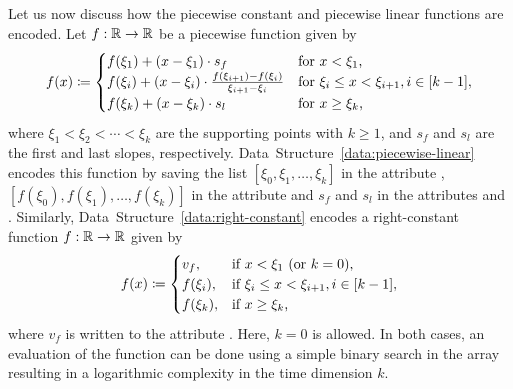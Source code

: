 Let us now discuss how the piecewise constant and piecewise linear functions are encoded.
Let $f: \mathbb{R} \rightarrow \mathbb{R}$ be a piecewise function given by \[
    f(x) \coloneqq \begin{cases}
        f(\xi_1) +  (x - \xi_1) \cdot s_f & \text{for $x < \xi_1$,} \\
        f(\xi_i) + (x - \xi_i) \cdot \frac{f(\xi_{i+1}) - f(\xi_i)}{\xi_{i+1} - \xi_i} & \text{for $\xi_i \leq x < \xi_{i+1}, i \in [k-1]$},\\
        f(\xi_k) + (x - \xi_k)\cdot s_l & \text{for $x \geq \xi_k$,}
    \end{cases}
\]
where $\xi_1 < \xi_2 < \cdots < \xi_k$ are the supporting points with $k\geq 1$, and $s_f$ and $s_l$ are the first and last slopes, respectively.
Data~Structure~\ref{data:piecewise-linear} encodes this function by saving the list $[\xi_0,\xi_1,\dots,\xi_k]$ in the attribute , $[f(\xi_0), f(\xi_1),\dots, f(\xi_k)]$ in the attribute  and $s_f$ and $s_l$ in the attributes  and .
Similarly, Data~Structure~\ref{data:right-constant} encodes a right-constant function $f:\mathbb{R} \rightarrow \mathbb{R}$ given by \[
    f(x) \coloneqq \begin{cases}
        v_f, & \text{if $x < \xi_1$ (or $k=0$),} \\
        f(\xi_i), & \text{if $\xi_i \leq x < \xi_{i+1}, i \in [k-1]$},\\
        f(\xi_k), & \text{if $x \geq \xi_k$,}
    \end{cases}
\]
where $v_f$ is written to the attribute .
Here, $k=0$ is allowed.
In both cases, an evaluation of the function can be done using a simple binary search in the  array resulting in a logarithmic complexity in the time dimension $k$.

